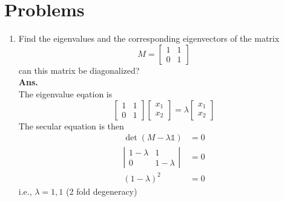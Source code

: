 	\section{Problems}
	\begin{enumerate}
		\item Find the eigenvalues and the corresponding eigenvectors of the matrix
		\begin{equation}
			M = \left[\begin{matrix}
			1 & 1 \\ 0 & 1
			\end{matrix}\right]
		\end{equation}
		can this matrix be diagonalized?\\
		
		\textbf{Ans.}\\
		The eigenvalue eqation is
		\begin{equation}
		\left[
			\begin{matrix}
				1 & 1 \\ 0 & 1
			\end{matrix}
			\right]
			\left[\begin{matrix}
			x_1 \\ x_2
			\end{matrix}\right] 
			= 
			\lambda 
			\left[\begin{matrix}
			x_1 \\ x_2
			\end{matrix}\right]
		\end{equation}
		The secular equation is then 
		\begin{eqnarray}
			\det(M - \lambda \mathbb{1}) &= 0 \nonumber\\
			\left|\begin{matrix}
			1-\lambda & 1 \\ 0 & 1-\lambda
			\end{matrix}\right| &=0 \nonumber \\
			\left(1-\lambda\right)^2 &= 0 \nonumber
		\end{eqnarray}
		i.e., $\lambda = 1,1$ (2 fold degeneracy)\\
		

\end{enumerate}
